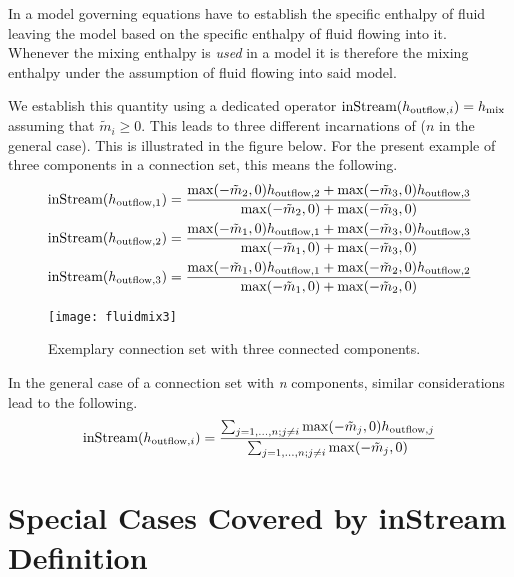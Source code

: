 In a model governing equations have to establish the specific enthalpy of fluid leaving the model based on the specific enthalpy of fluid flowing into it.
Whenever the mixing enthalpy is \emph{used} in a model it is therefore the mixing enthalpy under the assumption of fluid flowing into said model.

We establish this quantity using a dedicated operator $\text{\lstinline!inStream!}(h_{\mathrm{outflow},i})=h_{\mathrm{mix}}$ assuming that $\tilde{m}_{i} \geq 0$.
This leads to three different incarnations of ($n$ in the general case).
This is illustrated in the figure below.
For the present example of three components in a connection set, this means the following.
\begin{align*}
\text{\lstinline!inStream!}(h_{\mathrm{outflow},1}) &= \frac{\operatorname{max}(-\tilde{m}_2,0)h_{\mathrm{outflow},2}+\operatorname{max}(-\tilde{m}_3,0)h_{\mathrm{outflow},3}}{\operatorname{max}(-\tilde{m}_2,0)+\operatorname{max}(-\tilde{m}_3,0)}\\
\text{\lstinline!inStream!}(h_{\mathrm{outflow},2}) &= \frac{\operatorname{max}(-\tilde{m}_1,0)h_{\mathrm{outflow},1}+\operatorname{max}(-\tilde{m}_3,0)h_{\mathrm{outflow},3}}{\operatorname{max}(-\tilde{m}_1,0)+\operatorname{max}(-\tilde{m}_3,0)}\\
\text{\lstinline!inStream!}(h_{\mathrm{outflow},3}) &= \frac{\operatorname{max}(-\tilde{m}_1,0)h_{\mathrm{outflow},1}+\operatorname{max}(-\tilde{m}_2,0)h_{\mathrm{outflow},2}}{\operatorname{max}(-\tilde{m}_1,0)+\operatorname{max}(-\tilde{m}_2,0)}
\end{align*}
\begin{figure}[H]
  \begin{center}
    \texttt{[image: fluidmix3]}
  \end{center}
  \caption{Exemplary connection set with three connected components.}
\end{figure}

In the general case of a connection set with \emph{n} components, similar considerations lead to the following.
\begin{equation*}
\text{\lstinline!inStream!}(h_{\mathrm{outflow},i})=\frac{\sum_{j=1,\dotsc,n;j\neq i}\operatorname{max}(-\tilde{m}_j,0)h_{\mathrm{outflow},j}}{\sum_{j=1,\dotsc,n;j\neq i}\operatorname{max}(-\tilde{m}_j,0)}
\end{equation*}

\section{Special Cases Covered by inStream Definition}\label{special-cases-covered-by-the-instream-operator-definition}


